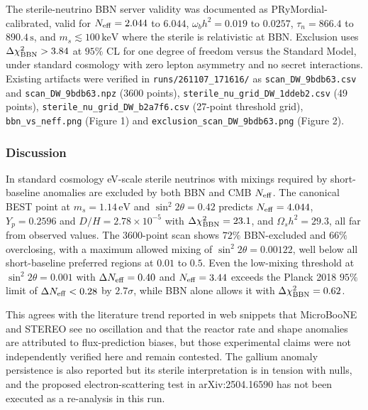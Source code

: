 \documentclass[11pt,a4paper]{article}
\begin{document}
The sterile-neutrino BBN server validity was documented as PRyMordial-calibrated, valid for $N_{\rm eff} = 2.044$ to $6.044$, $\omega_b h^2 = 0.019$ to $0.0257$, $\tau_n = 866.4$ to $890.4\,\mathrm{s}$, and $m_s \lesssim 100\,\mathrm{keV}$ where the sterile is relativistic at BBN. Exclusion uses $\Delta\chi^2_{\rm BBN} > 3.84$ at $95\%$ CL for one degree of freedom versus the Standard Model, under standard cosmology with zero lepton asymmetry and no secret interactions. Existing artifacts were verified in \texttt{runs/\allowbreak{}261107\_\allowbreak{}171616/\allowbreak{}} as \texttt{scan\_\allowbreak{}DW\_\allowbreak{}9bdb63.csv} and \texttt{scan\_\allowbreak{}DW\_\allowbreak{}9bdb63.npz} (3600 points), \texttt{sterile\_\allowbreak{}nu\_\allowbreak{}grid\_\allowbreak{}DW\_\allowbreak{}1ddeb2.csv} (49 points), \texttt{sterile\_\allowbreak{}nu\_\allowbreak{}grid\_\allowbreak{}DW\_\allowbreak{}b2a7f6.csv} (27-point threshold grid), \texttt{bbn\_\allowbreak{}vs\_\allowbreak{}neff.png} (Figure 1) and \texttt{exclusion\_\allowbreak{}scan\_\allowbreak{}DW\_\allowbreak{}9bdb63.png} (Figure 2).

\subsubsection*{Discussion}
In standard cosmology eV-scale sterile neutrinos with mixings required by short-baseline anomalies are excluded by both BBN and CMB $N_{\rm eff}$. The canonical BEST point at $m_s = 1.14\,\mathrm{eV}$ and $\sin^2 2\theta = 0.42$ predicts $N_{\rm eff} = 4.044$, $Y_p = 0.2596$ and $D/H = 2.78 \times 10^{-5}$ with $\Delta\chi^2_{\rm BBN} = 23.1$, and $\Omega_s h^2 = 29.3$, all far from observed values. The 3600-point scan shows $72\%$ BBN-excluded and $66\%$ overclosing, with a maximum allowed mixing of $\sin^2 2\theta = 0.00122$, well below all short-baseline preferred regions at $0.01$ to $0.5$. Even the low-mixing threshold at $\sin^2 2\theta = 0.001$ with $\Delta N_{\rm eff} = 0.40$ and $N_{\rm eff} = 3.44$ exceeds the Planck 2018 $95\%$ limit of $\Delta N_{\rm eff} < 0.28$ by $2.7\sigma$, while BBN alone allows it with $\Delta\chi^2_{\rm BBN} = 0.62$.

This agrees with the literature trend reported in web snippets that MicroBooNE and STEREO see no oscillation and that the reactor rate and shape anomalies are attributed to flux-prediction biases, but those experimental claims were not independently verified here and remain contested. The gallium anomaly persistence is also reported but its sterile interpretation is in tension with nulls, and the proposed electron-scattering test in arXiv:2504.16590 has not been executed as a re-analysis in this run.
\end{document}
